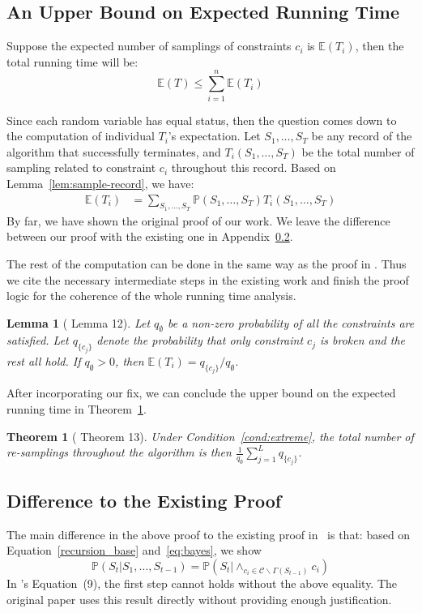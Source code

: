 \documentclass[letterpaper]{article} %
\newtheorem{theorem}{Theorem}
\newtheorem*{lemma*}{Lemma}
\newcommand{\p}{\mathbb{P}}
\newcommand{\e}{\mathbb{E}}
\begin{document}
\subsection{An Upper Bound on Expected Running Time}
Suppose the expected number of samplings of constraints $c_i$ is $\e(T_i)$, then the total running time will be:
\begin{equation*}
\e(T) \le \sum_{i=1}^n \e (T_i)
\end{equation*}

Since each random variable has equal status, then the question comes down to the computation of individual $T_i$'s expectation. Let $S_1,\ldots,S_T$ be any record of the algorithm that successfully terminates, and $T_i(S_1,\ldots,S_T)$ be the total number of sampling related to constraint $c_i$ throughout this record.  Based on Lemma~\ref{lem:sample-record}, we have:
\begin{align*} \label{ti_formula}
    \e(T_i) &= \sum_{S_1,\ldots,S_T} \p(S_1,\ldots,S_T)T_i(S_1,\ldots,S_T) 
\end{align*}
{By far, we have shown the original proof of our work. We leave the difference between our proof with the existing one in Appendix~\ref{apx:difference}.}

The rest of the computation can be done in the same way as the proof in \citet{DBLP:journals/jacm/GuoJL19}. Thus we cite the necessary intermediate steps in the existing work and finish the proof logic for the coherence of the whole running time analysis.
\begin{lemma*}[\citet{DBLP:journals/jacm/GuoJL19} Lemma 12] \label{thm:runtime} Let $q_{\emptyset}$ be a non-zero probability of all the constraints are satisfied. Let $q_{\{c_j\}}$ denote the probability that only constraint $c_j$ is broken and the rest all hold. If $q_\emptyset>0$, then
$\e(T_i) ={q_{\{c_j\}}}/{q_\emptyset}$.
\end{lemma*}

After incorporating our fix, we can conclude the upper bound on the expected running time in Theorem~\ref{thm:time}.
\begin{theorem}[\citet{DBLP:journals/jacm/GuoJL19} Theorem 13] \label{thm:time} Under Condition~\ref{cond:extreme},
 the total number of re-samplings throughout the algorithm is then $\frac{1}{q_{\emptyset}}\sum_{j=1}^L q_{\{c_j\}}$.
\end{theorem}

\subsection{Difference to the Existing Proof}  \label{apx:difference}
 The main difference in the above proof to the existing proof in~\cite[Theorem 13]{DBLP:journals/jacm/GuoJL19} is that: based on Equation~\eqref{recursion_base} and~\eqref{eq:bayes}, we show
\begin{equation*}
\p(S_t | S_1, \ldots, S_{t-1})=\p(S_t |\wedge_{c_i \in \mathcal{C}\backslash \Gamma(S_{t-1})}c_i)
\end{equation*}
In \citet{DBLP:journals/jacm/GuoJL19}'s Equation~(9), the first step cannot holds without the above equality. The original paper uses this result directly without providing enough justification.
\end{document}
